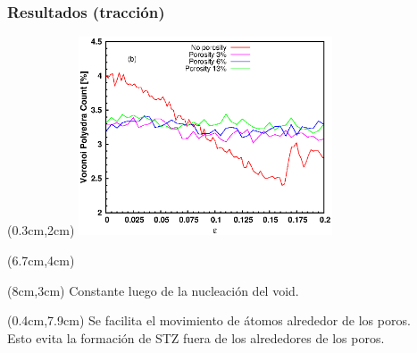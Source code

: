 \begin{frame}
    \frametitle{Resultados (tracci\'on)}
    \begin{textblock*}{7.5cm}(0.3cm,2cm) %
        \includegraphics[width=7.5cm]{Presentacion_PANACM_Franco/tipe3_strain_tens.eps}
    \end{textblock*}
    \begin{textblock*}{4.2cm}(6.7cm,4cm) %
    \end{textblock*}
    \begin{textblock*}{5cm}(8cm,3cm) %
        Constante luego de la nucleaci\'on del void.
    \end{textblock*}
    \begin{textblock*}{12cm}(0.4cm,7.9cm) %
    \centering
	Se facilita el movimiento de \'atomos alrededor de los poros.\\
	Esto evita la formaci\'on de STZ fuera de los alrededores de los poros.
    \end{textblock*}
\end{frame}



